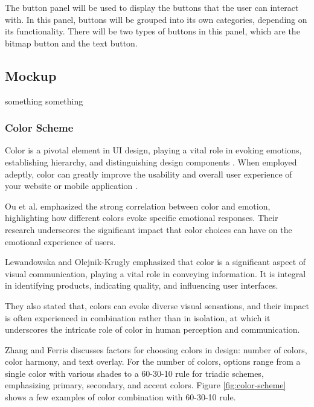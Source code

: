 The button panel will be used to display the buttons that the user can interact with. In this panel, buttons will be grouped into its own categories, depending on its functionality. There will be two types of buttons in this panel, which are the bitmap button and the text button.

\subsection{Mockup}

something something

\subsubsection{Color Scheme}

Color is a pivotal element in UI design, playing a vital role in evoking emotions, establishing hierarchy, and distinguishing design components \cite{M._2023}. When employed adeptly, color can greatly improve the usability and overall user experience of your website or mobile application \cite{M._2023}.

Ou et al. \cite{Ou04} emphasized the strong correlation between color and emotion, highlighting how different colors evoke specific emotional responses. Their research underscores the significant impact that color choices can have on the emotional experience of users.

Lewandowska and Olejnik-Krugly \cite{Lewandowska2021} emphasized that color is a significant aspect of visual communication, playing a vital role in conveying information. It is integral in identifying products, indicating quality, and influencing user interfaces.

They also stated that, colors can evoke diverse visual sensations, and their impact is often experienced in combination rather than in isolation, at which it underscores the intricate role of color in human perception and communication.

Zhang and Ferris \cite{Zhang16} discusses factors for choosing colors in design: number of colors, color harmony, and text overlay. For the number of colors, options range from a single color with various shades to a 60-30-10 rule for triadic schemes, emphasizing primary, secondary, and accent colors. Figure \ref{fig:color-scheme} shows a few examples of color combination with 60-30-10 rule.

